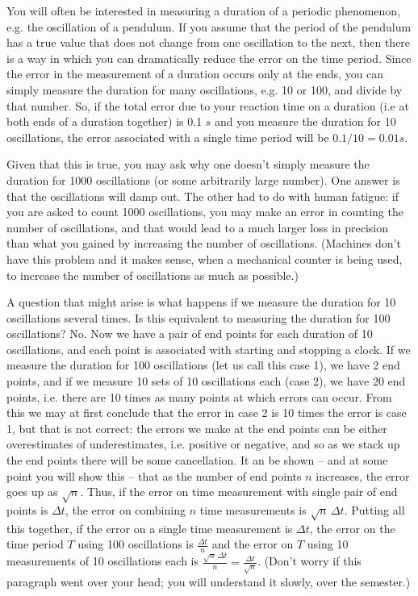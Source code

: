 You will often be interested in measuring a duration of a periodic phenomenon, e.g. the oscillation of a pendulum. If you assume that the period of the pendulum has a true value that does not change from one oscillation to the next, then there is a way in which you can dramatically reduce the error on the time period. Since the error in the measurement of a duration occurs only at the ends, you can simply measure the duration for many oscillations, e.g. 10 or 100, and divide by that number. So, if the total error due to your reaction time on a duration (i.e at both ends of a duration together) is 0.1 $s$ and you measure the duration for 10 oscillations, the error associated with a single time period will be $0.1/10 = 0.01 s$.

Given that this is true, you may ask why one doesn't simply measure the duration for 1000 oscillations (or some arbitrarily large number). One answer is that the oscillations will damp out. The other had to do with human fatigue: if you are asked to count 1000 oscillations, you may make an error in counting the number of oscillations, and that would lead to a much larger loss in precision than what you gained by increasing the number of oscillations. (Machines don't have this problem and it makes sense, when a mechanical counter is being used, to increase the number of oscillations as much as possible.) 

A question that might arise is what happens if we measure the duration for 10 oscillations several times. Is this equivalent to measuring the duration for 100 oscillations? No. Now we have a pair of end points for each duration of 10 oscillations, and each point is associated with starting and stopping a clock. If we measure the duration for 100 oscillations (let us call this case 1), we have 2 end points, and if we measure 10 sets of 10 oscillations each (case 2), we have 20 end points, i.e. there are 10 times as many points at which errors can occur. From this we may at first conclude that the error in case 2 is 10 times the error is case 1, but that is not correct: the errors we make at the end points can be either overestimates of underestimates, i.e. positive or negative, and so as we stack up the end points there will be some cancellation. It an be shown -- and at some point you will show this -- that as the number of end points $n$ increases, the error goes up as $\sqrt{n}$. Thus, if the error on time measurement with single pair of end points is $\Delta t$, the error on combining $n$ time measurements is $\sqrt{n} \, \Delta t$. Putting all this together, if the error on a single time measurement is $\Delta t$, the error on the time period $T$ using 100 oscillations is $\frac{\Delta t}{n}$ and the error on $T$ using 10 measurements of 10 oscillations each is $\frac{\sqrt{n} \, \Delta t}{n} = \frac{\Delta t}{\sqrt{n}}$. (Don't worry if this paragraph went over your head; you will understand it slowly, over the semester.)

